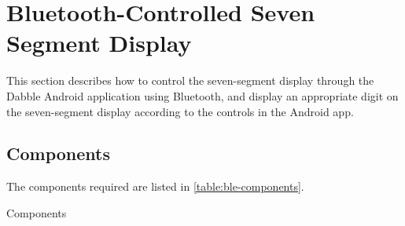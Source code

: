 \section{Bluetooth-Controlled Seven Segment Display}
This section describes how to control the seven-segment display through the
Dabble Android application using Bluetooth, and display an appropriate digit on
the seven-segment display according to the controls in the Android app.

\subsection{Components}
The components required are listed in \autoref{table:ble-components}.
\begin{table}[!ht]
\centering

\caption{Components}
\label{table:ble-components}
\end{table}
